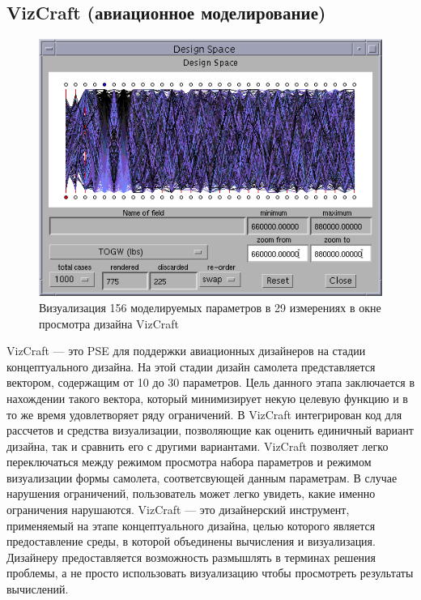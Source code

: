 \subsection{VizCraft (авиационное моделирование)}
\begin{figure}
  \centering
    \includegraphics[width=12cm]{images/vizcraft-screenshot.png}
  \caption{Визуализация 156 моделируемых параметров в 29 измерениях в окне просмотра дизайна VizCraft}
  \label{fig:vizcraft-screenshot}
\end{figure}       

VizCraft --- это PSE для поддержки авиационных дизайнеров на стадии концептуального дизайна. На этой стадии дизайн самолета представляется вектором, содержащим от 10 до 30 параметров. Цель данного этапа заключается в нахождении такого вектора, который минимизирует некую целевую функцию и в то же время удовлетворяет ряду ограничений. В VizCraft интегрирован код для рассчетов и средства визуализации, позволяющие как оценить единичный вариант дизайна, так и сравнить его с другими вариантами. VizCraft позволяет легко переключаться между режимом просмотра набора параметров и режимом визуализации формы самолета, соответсвующей данным параметрам. В случае нарушения ограничений, пользователь может легко увидеть, какие именно ограничения нарушаются. VizCraft --- это дизайнерский инструмент, применяемый на этапе концептуального дизайна, целью которого является предоставление среды, в которой объединены вычисления и визуализация. Дизайнеру предоставляется возможность размышлять в терминах решения проблемы, а не просто использовать визуализацию чтобы просмотреть результаты вычислений.

